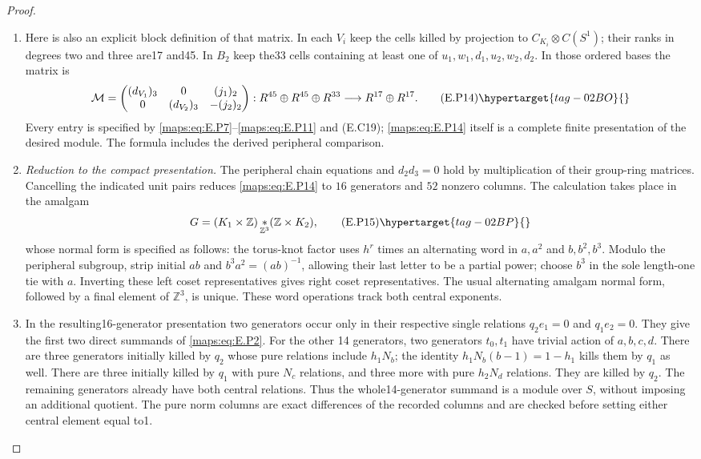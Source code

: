\begin{proof}
\begin{enumerate}[label={$\langle1\rangle$\arabic*.},leftmargin=*]
\item Here is also an explicit block definition of that
matrix. In each $V_i$ keep the cells killed by
projection to $C_{K_i}\otimes C(S^1)$; their ranks
in degrees two and three are17 and45. In $B_2$
keep the33 cells containing at least one of
$u_1,w_1,d_1,u_2,w_2,d_2$. In those ordered bases
the matrix is
\[
 \mathcal M=
 \begin{pmatrix}
 (d_{V_1})_3&0&(j_1)_2\\
 0&(d_{V_2})_3&-(j_2)_2
 \end{pmatrix}:
 R^{45}\oplus R^{45}\oplus R^{33}
             \longrightarrow R^{17}\oplus R^{17}.
 \tag{E.P14}\hypertarget{tag-02BO}{}\label{maps:eq:E.P14}
\]
Every entry is specified by \eqref{maps:eq:E.P7}--\eqref{maps:eq:E.P11} and
(E.C19); \eqref{maps:eq:E.P14} itself is a complete finite
presentation of the desired module. The formula
includes the derived peripheral comparison.


\item \emph{Reduction to the compact presentation.}
The peripheral chain equations and $d_2d_3=0$ hold by multiplication
of their group-ring matrices. Cancelling the indicated unit pairs reduces
\eqref{maps:eq:E.P14} to $16$ generators and $52$ nonzero columns.
The calculation takes place in the amalgam
\[
 G=(K_1\times\mathbb Z)\mathop{*}_{\mathbb Z^3}
                                      (\mathbb Z\times K_2),
 \tag{E.P15}\hypertarget{tag-02BP}{}\label{maps:eq:E.P15}
\]
whose normal form is specified as follows: the torus-knot factor uses $h^r$ times an
alternating word in $a,a^2$ and $b,b^2,b^3$.
Modulo the peripheral subgroup, strip initial
$ab$ and $b^3a^2=(ab)^{-1}$, allowing their last
letter to be a partial power; choose $b^3$ in
the sole length-one tie with $a$. Inverting these
left coset representatives gives right coset
representatives. The usual alternating amalgam
normal form, followed by a final element of
$\mathbb Z^3$, is unique. These word operations track both central exponents.

\item In the resulting16-generator presentation two
generators occur only in their respective single
relations $q_2e_1=0$ and $q_1e_2=0$. They give the
first two direct summands of \eqref{maps:eq:E.P2}. For the other
14 generators, two generators $t_0,t_1$ have
trivial action of $a,b,c,d$. There are three
generators initially killed by $q_2$ whose pure
relations include $h_1N_b$; the identity
$h_1N_b(b-1)=1-h_1$ kills them by $q_1$ as well.
There are three initially killed by $q_1$ with
pure $N_c$ relations, and three more with pure
$h_2N_d$ relations. They are killed by $q_2$.
The remaining generators already have both
central relations. Thus the whole14-generator
summand is a module over $S$, without imposing
an additional quotient. The pure norm columns
are exact differences of the recorded columns
and are checked before setting either central
element equal to1.


\end{enumerate}
\end{proof}
